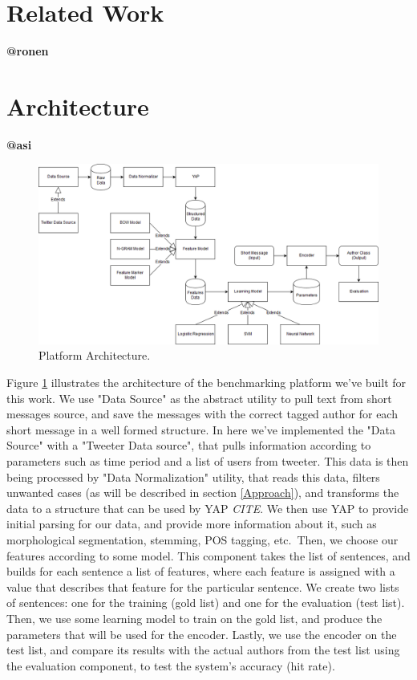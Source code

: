 \documentclass[a4paper]{article}
\begin{document}
\section{Related Work}
\label{Related Work}
\textbf{@ronen}\\
\section{Architecture}
\label{Architecture}
\textbf{@asi}\\
\begin{figure}
	\includegraphics[width=1\textwidth]{"architecture/NLP Author Classification Architecture"}
	\caption{Platform Architecture.}
		\label{fig:architecture}
\end{figure}
Figure \ref{fig:architecture} illustrates the architecture of the benchmarking platform we've built for this work.
We use "Data Source" as the abstract utility to pull text from short messages source, and save the messages with the correct tagged author for each short message in a well formed structure.
In here we've implemented the "Data Source" with a "Tweeter Data source", that pulls information according to parameters such as time period and a list of users from tweeter.
This data is then being processed by "Data Normalization" utility, that reads this data, filters unwanted cases (as will be described in section \ref{Approach}), and transforms the data to a structure that can be used by YAP \emph{CITE}.
We then use YAP to provide initial parsing for our data, and provide more information about it, such as morphological segmentation, stemming, POS tagging, etc.\
Then, we choose our features according to some model. This component takes the list of sentences, and builds for each sentence a list of features, where each feature is assigned with a value that describes that feature for the particular sentence.
We create two lists of sentences: one for the training (gold list) and one for the evaluation (test list).
Then, we use some learning model to train on the gold list, and produce the parameters that will be used for the encoder.
Lastly, we use the encoder on the test list, and compare its results with the actual authors from the test list using the evaluation component, to test the system's accuracy (hit rate).
\end{document}
